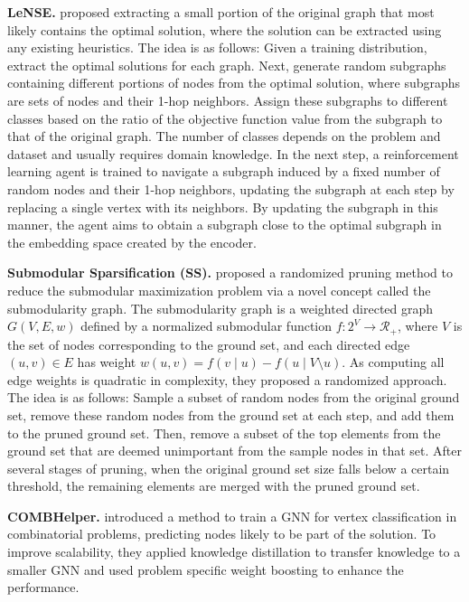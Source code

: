 \textbf{LeNSE.} \citet{ireland2022lense} proposed extracting a small portion of the original graph that most likely contains the optimal solution, where the solution can be extracted using any existing heuristics. The idea is as follows: Given a training distribution, extract the optimal solutions for each graph. Next, generate random subgraphs containing different portions of nodes from the optimal solution, where subgraphs are sets of nodes and their 1-hop neighbors. Assign these subgraphs to different classes based on the ratio of the objective function value from the subgraph to that of the original graph. The number of classes depends on the problem and dataset and usually requires domain knowledge.
In the next step, a reinforcement learning agent is trained to navigate a subgraph induced by a fixed number of random nodes and their 1-hop neighbors, updating the subgraph at each step by replacing a single vertex with its neighbors. By updating the subgraph in this manner, the agent aims to obtain a subgraph close to the optimal subgraph in the embedding space created by the encoder.

\textbf{Submodular Sparsification (SS).}   \citet{zhou2017scaling} proposed a randomized pruning method to reduce the submodular maximization problem via a novel concept called the submodularity graph. The submodularity graph is a weighted directed graph \( G(V,E,w) \) defined by a normalized submodular function \( f: 2^{V} \rightarrow \mathcal{R_+} \), where \( V \) is the set of nodes corresponding to the ground set, and each directed edge \( (u,v) \in E \) has weight \( w(u,v) = f(v \mid u) - f(u \mid V \setminus u) \). As computing all edge weights is quadratic in complexity, they proposed a randomized approach. The idea is as follows: Sample a subset of random nodes from the original ground set, remove these random nodes from the ground set at each step, and add them to the pruned ground set. Then, remove a subset of the top elements from the ground set that are deemed unimportant from the sample nodes in that set. After several stages of pruning, when the original ground set size falls below a certain threshold, the remaining elements are merged with the pruned ground set.

\textbf{COMBHelper.}  \citet{tian2024combhelper} introduced a method to train a GNN for vertex classification in combinatorial problems, predicting nodes likely to be part of the solution. To improve scalability, they applied knowledge distillation to transfer knowledge to a smaller GNN and used problem specific weight boosting to enhance the performance. 


